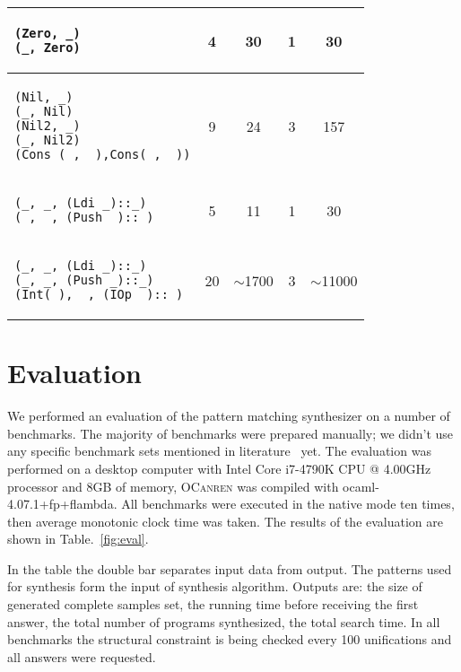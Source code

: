 \begin{table}[t]
\begin{tabular}{|m{3.5cm}||cccc|}
\begin{lstlisting}[basicstyle=\scriptsize]
(Zero, _)
(_, Zero)
    \end{lstlisting} &4&30&1&30
    \\
        \hline
     \begin{lstlisting}[basicstyle=\scriptsize]
(Nil, _)
(_, Nil)
(Nil2, _)
(_, Nil2)
(Cons (_, _),Cons(_, _))
    \end{lstlisting}
     &9&24&3&157                    \\ 
      \hline
     \begin{lstlisting}[basicstyle=\scriptsize]
(_, _, (Ldi _)::_)
(_, _, (Push _)::_)
    \end{lstlisting} &5&11&1&30\\
        \hline      
        \begin{lstlisting}[basicstyle=\scriptsize]
(_, _, (Ldi _)::_)
(_, _, (Push _)::_)
(Int(_), _, (IOp _)::_)
\end{lstlisting}
     &20&$\sim$1700&3&$\sim$11000                    \\ \hline
  \end{tabular}

\end{table}

\FloatBarrier

\section{Evaluation}
\label{sec:eval}


We performed an evaluation of the pattern matching synthesizer on a number of benchmarks.
The majority of benchmarks were prepared manually; we didn't use any specific benchmark sets mentioned in literature~\cite{Scott2000WhenDM} yet.
The evaluation was performed on a desktop computer with Intel Core i7-4790K CPU @ 4.00GHz processor and 8GB of memory,
\textsc{OCanren} was compiled with \mbox{ocaml-4.07.1+fp+flambda}. All benchmarks were executed in the native mode ten times,
then average monotonic clock time was taken. The results of the evaluation are shown in Table.~\ref{fig:eval}.

In the table the double bar separates input data from output. %
The patterns used for synthesis form the input of synthesis algorithm.
Outputs are: the size of generated complete samples set, the running time before receiving the
first answer, the total number of programs synthesized, the total search time.
In all benchmarks the structural constraint is being checked every 100 unifications and all answers were requested.

